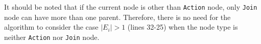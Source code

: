 It should be noted that if the current node is other than
\texttt{Action} node, only \texttt{Join} node can have more than one
parent. Therefore, there is no need for the algorithm to consider the
case $|E_i| > 1$ (lines 32-25) when the node type is neither
\texttt{Action} nor \texttt{Join} node.


































